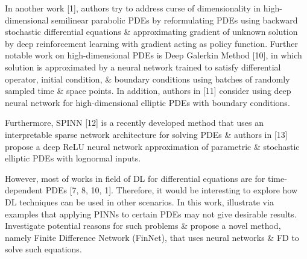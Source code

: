 \documentclass{article}
\begin{document}
\begin{itemize}
	In another work [1], authors try to address curse of dimensionality in high-dimensional semilinear parabolic PDEs by reformulating PDEs using backward stochastic differential equations \& approximating gradient of unknown solution by deep reinforcement learning with gradient acting as policy function. Further notable work on high-dimensional PDEs is Deep Galerkin Method [10], in which solution is approximated by a neural network trained to satisfy differential operator, initial condition, \& boundary conditions using batches of randomly sampled time \& space points. In addition, authors in [11] consider using deep neural network for high-dimensional elliptic PDEs with boundary conditions.

	Furthermore, SPINN [12] is a recently developed method that uses an interpretable sparse network architecture for solving PDEs \& authors in [13] propose a deep ReLU neural network approximation of parametric \& stochastic elliptic PDEs with lognormal inputs.

	However, most of works in field of DL for differential equations are for time-dependent PDEs [7, 8, 10, 1]. Therefore, it would be interesting to explore how DL techniques can be used in other scenarios. In this work, illustrate via examples that applying PINNs to certain PDEs may not give desirable results. Investigate potential reasons for such problems \& propose a novel method, namely Finite Difference Network (FinNet), that uses neural networks \& FD to solve such equations.


\end{itemize}
\end{document}
